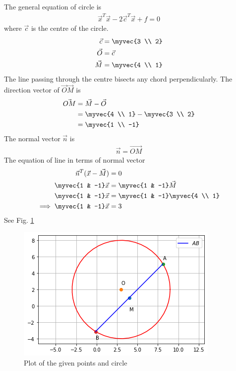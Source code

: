 
The general equation of circle is
\begin{align}
    \vec{x}^T\vec{x} - 2\vec{c}^T\vec{x} + f = 0
\end{align}
where $\vec{c}$ is the centre of the circle.
\begin{align}
    \vec{c} &= \myvec{3 \\ 2}\\
    \vec{O} &= \vec{c}\\
    \vec{M} &= \myvec{4 \\ 1}
\end{align}
The line passing through the centre bisects any chord perpendicularly. The direction vector of $\vec{O}\vec{M}$ is
\begin{align}
    \vec{OM} &= \vec{M} - \vec{O}\\
    &= \myvec{4 \\ 1} - \myvec{3 \\ 2}\\
    &= \myvec{1 \\ -1}
\end{align}
The normal vector $\vec{n}$ is
\begin{align}
    \vec{n} = \vec{OM}
\end{align}
The equation of line in terms of normal vector
\begin{align}
    \vec{n}^T(\vec{x} - \vec{M}) &= 0\\
    \myvec{1 & -1}\vec{x} &= \myvec{1 & -1}\vec{M}\\
    \myvec{1 & -1}\vec{x} &= \myvec{1 & -1}\myvec{4 \\ 1}\\
\implies     \myvec{1 & -1}\vec{x} &= 3
\end{align}
See Fig.     \ref{rams/4/2/18/fig:plot}
\begin{figure}[htp]
    \centering
    \includegraphics[width=\columnwidth]{solutions/4/2/18/Figures/Fig1.png}
    \caption{Plot of the given points and circle}
    \label{rams/4/2/18/fig:plot}
\end{figure}


